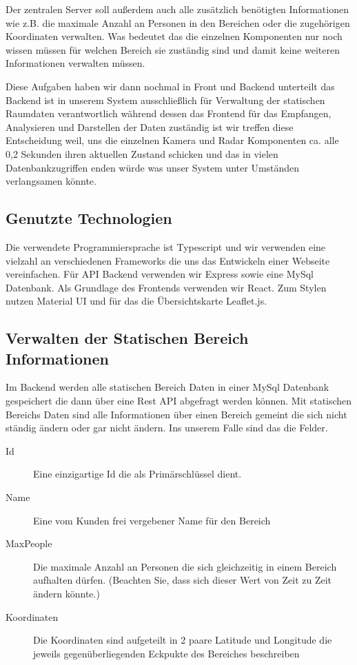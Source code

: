 \documentclass[report]{scrartcl}
\begin{document}
Der zentralen Server soll außerdem auch alle zusätzlich benötigten
Informationen wie z.B. die maximale Anzahl an Personen in den Bereichen oder
die zugehörigen Koordinaten verwalten. Was bedeutet das die einzelnen
Komponenten nur noch wissen müssen für welchen Bereich sie zuständig sind und
damit keine weiteren Informationen verwalten müssen.

Diese Aufgaben haben wir dann nochmal in Front und Backend unterteilt das
Backend ist in unserem System ausschließlich für Verwaltung der statischen
Raumdaten verantwortlich während dessen das Frontend für das Empfangen,
Analysieren und Darstellen der Daten zuständig ist wir treffen diese
Entscheidung weil, uns die einzelnen Kamera und Radar Komponenten ca. alle 0,2
Sekunden ihren aktuellen Zustand schicken und das in vielen Datenbankzugriffen
enden würde was unser System unter Umständen verlangsamen könnte.

\subsection{Genutzte Technologien}

Die verwendete Programmiersprache ist Typescript und wir verwenden eine
vielzahl an verschiedenen Frameworks die uns das Entwickeln einer Webseite
vereinfachen. Für API Backend verwenden wir Express sowie eine MySql Datenbank.
Als Grundlage des Frontends verwenden wir React. Zum Stylen nutzen Material UI
und für das die Übersichtskarte Leaflet.js.

\subsection{Verwalten der Statischen Bereich Informationen}

Im Backend werden alle statischen Bereich Daten in einer MySql Datenbank
gespeichert die dann über eine Rest API abgefragt werden können. Mit statischen
Bereichs Daten sind alle Informationen über einen Bereich gemeint die sich
nicht ständig ändern oder gar nicht ändern. Ins unserem Falle sind das die
Felder.

\begin{description}
  \item[Id] Eine einzigartige Id die als Primärschlüssel dient.
  \item[Name] Eine vom Kunden frei vergebener Name für den Bereich
  \item[MaxPeople] Die maximale Anzahl an Personen die sich gleichzeitig in einem
    Bereich aufhalten dürfen. (Beachten Sie, dass sich dieser Wert von Zeit zu Zeit
    ändern könnte.)
  \item[Koordinaten] Die Koordinaten sind aufgeteilt in 2 paare Latitude und Longitude
    die jeweils gegenüberliegenden Eckpukte des Bereiches beschreiben
\end{description}
\end{document}
